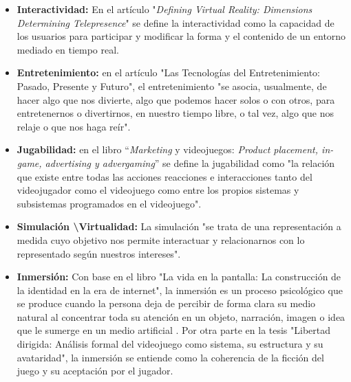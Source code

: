    \begin{itemize}
        \item \textbf{Interactividad:} En el artículo "\textit{Defining Virtual Reality:
         Dimensions Determining Telepresence}" se define la interactividad como la
         capacidad de los usuarios para participar y modificar la forma y el contenido
         de un entorno mediado en tiempo real\cite{RefInteractividad}.  
        
        \item \textbf{Entretenimiento:} en el artículo "Las Tecnologías del
         Entretenimiento: Pasado, Presente y Futuro", el entretenimiento "se asocia,
         usualmente, de hacer algo que nos divierte, algo que podemos hacer solos o con
         otros, para entretenernos o divertirnos, en nuestro tiempo libre, o tal vez,
         algo que nos relaje o que nos haga reír"\cite{RefEntretenimiento}.
        
        \item \textbf{Jugabilidad:} en el libro “\textit{Marketing} y videojuegos:
    \textit{Product placement, in-game, advertising y advergaming}” se define la
    jugabilidad como "la relación que existe entre todas las acciones reacciones e
    interacciones tanto del videojugador como el videojuego como entre los propios
    sistemas y subsistemas programados en el videojuego"\cite{RefCarac}.        
    
        \item \textbf{Simulación \textbackslash Virtualidad:} La simulación "se trata
        de una representación a medida cuyo objetivo nos permite interactuar y
        relacionarnos con lo representado según nuestros intereses"\cite{RefCarac}.
        
        \item \textbf{Inmersión:} Con base en el libro "La vida en la pantalla: La
         construcción de la identidad en la era de internet", la inmersión es un
         proceso psicológico que se produce cuando la persona deja de percibir de
         forma clara su medio natural al concentrar toda su atención en un objeto,
          narración, imagen o idea que le sumerge en un medio artificial
          \cite{RefInmersion}. Por otra parte en la tesis "Libertad dirigida: Análisis
          formal del videojuego como sistema, su estructura y su avataridad", la
          inmersión se entiende como la coherencia de la ficción del juego y su
          aceptación por el jugador.\cite{refInmersionNavarro}  
    \end{itemize}

